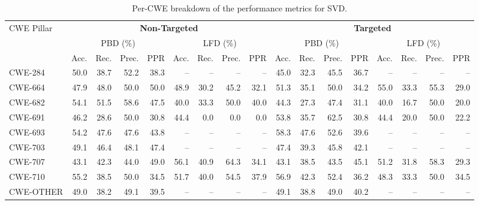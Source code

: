 \documentclass[lettersize,journal]{IEEEtran}
\begin{document}
\begin{table}[!t]
    \centering
    \caption{Per-CWE breakdown of the performance metrics for \gls{SVD}.}
    \label{tab:cwe-metrics-svd}
    \scriptsize
    \renewcommand{\arraystretch}{1.0}
    \setlength{\tabcolsep}{1.8pt}
    \begin{tabular}{l rr rr rr rr rr rr rr rr}
    \toprule
    \multirow{3}{*}{CWE Pillar}
      & \multicolumn{8}{c}{\textbf{Non-Targeted}}
      & \multicolumn{8}{c}{\textbf{Targeted}} \\
    \cmidrule(lr){2-9} \cmidrule(lr){10-17}
      & \multicolumn{4}{c}{PBD (\%)} & \multicolumn{4}{c}{LFD (\%)}
      & \multicolumn{4}{c}{PBD (\%)} & \multicolumn{4}{c}{LFD (\%)} \\
    \cmidrule(lr){2-5} \cmidrule(lr){6-9} \cmidrule(lr){10-13} \cmidrule(lr){14-17}
      & Acc. & Rec. & Prec. & PPR 
      & Acc. & Rec. & Prec. & PPR 
      & Acc. & Rec. & Prec. & PPR 
      & Acc. & Rec. & Prec. & PPR \\
    \midrule
    CWE-284 & 50.0 & 38.7 & 52.2 & 38.3 & -- & -- & -- & -- & 45.0 & 32.3 & 45.5 & 36.7 & -- & -- & -- & -- \\
    CWE-664 & 47.9 & 48.0 & 50.0 & 50.0 & 48.9 & 30.2 & 45.2 & 32.1 & 51.3 & 35.1 & 50.0 & 34.2 & 55.0 & 33.3 & 55.3 & 29.0 \\
    CWE-682 & 54.1 & 51.5 & 58.6 & 47.5 & 40.0 & 33.3 & 50.0 & 40.0 & 44.3 & 27.3 & 47.4 & 31.1 & 40.0 & 16.7 & 50.0 & 20.0 \\
    CWE-691 & 46.2 & 28.6 & 50.0 & 30.8 & 44.4 & 0.0 & 0.0 & 0.0 & 53.8 & 35.7 & 62.5 & 30.8 & 44.4 & 20.0 & 50.0 & 22.2 \\
    CWE-693 & 54.2 & 47.6 & 47.6 & 43.8 & -- & -- & -- & -- & 58.3 & 47.6 & 52.6 & 39.6 & -- & -- & -- & -- \\
    CWE-703 & 49.1 & 46.4 & 48.1 & 47.4 & -- & -- & -- & -- & 47.4 & 39.3 & 45.8 & 42.1 & -- & -- & -- & -- \\
    CWE-707 & 43.1 & 42.3 & 44.0 & 49.0 & 56.1 & 40.9 & 64.3 & 34.1 & 43.1 & 38.5 & 43.5 & 45.1 & 51.2 & 31.8 & 58.3 & 29.3 \\
    CWE-710 & 55.2 & 38.5 & 50.0 & 34.5 & 51.7 & 40.0 & 54.5 & 37.9 & 56.9 & 42.3 & 52.4 & 36.2 & 48.3 & 33.3 & 50.0 & 34.5 \\
    CWE-OTHER & 49.0 & 38.2 & 49.1 & 39.5 & -- & -- & -- & -- & 49.1 & 38.8 & 49.0 & 40.2 & -- & -- & -- & -- \\
    \bottomrule
    \end{tabular}
\end{table}
\end{document}
